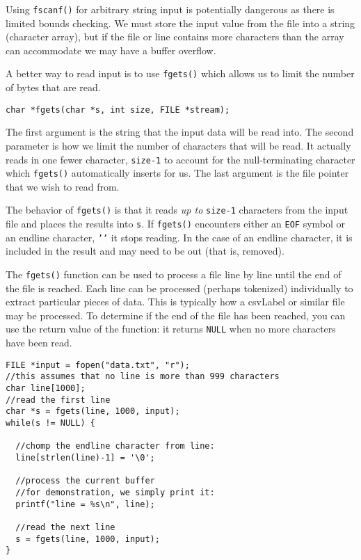 Using \texttt{fscanf()} for arbitrary string 
input is potentially dangerous as there is limited
bounds checking.  We must store the input value from
the file into a string (character array), but if the
file or line contains more characters than the 
array can accommodate we may have a buffer overflow.

A better way to read input is to use \texttt{fgets()}
which allows us to limit the number of bytes that are
read.

\texttt{char *fgets(char *s, int size, FILE *stream);}

The first argument is the string that the input
data will be read into.  The second parameter is how
we limit the number of characters that will be read.
It actually reads in one fewer character, \texttt{size-1}
to account for the null-terminating character which
\texttt{fgets()} automatically inserts for us.
The last argument is the file pointer that we wish to
read from.

The behavior of \texttt{fgets()} is that it reads 
\emph{up to} \texttt{size-1} characters from the
input file and places the results into \texttt{s}.
If \texttt{fgets()} encounters either an \texttt{EOF}
symbol or an endline character, \texttt{'\n'} it 
stops reading.  In the case of an endline character, it is
included in the result and may need to be  out
(that is, removed).

The \texttt{fgets()} function can be used to process
a file line by line until the end of the file is reached.
Each line can be processed (perhaps tokenized) individually
to extract particular pieces of data.  This is typically how
a \gls{csvLabel} or similar file may be processed.  To determine
if the end of the file has been reached, you can use the 
return value of the function: it returns \texttt{NULL}
when no more characters have been read.

\begin{verbatim}
FILE *input = fopen("data.txt", "r");
//this assumes that no line is more than 999 characters
char line[1000];
//read the first line
char *s = fgets(line, 1000, input);
while(s != NULL) {

  //chomp the endline character from line:
  line[strlen(line)-1] = '\0';

  //process the current buffer
  //for demonstration, we simply print it:
  printf("line = %s\n", line);

  //read the next line 
  s = fgets(line, 1000, input);
}
\end{verbatim}

